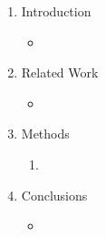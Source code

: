 \documentclass{article}
\begin{document}
\begin{enumerate}
	\item Introduction
	\begin{itemize}
		\item 
	\end{itemize}
	\item Related Work
	\begin{itemize}
		\item 
	\end{itemize}
	\item Methods
	\begin{enumerate}
		\item 
	\end{enumerate}
	\item Conclusions
	\begin{itemize}
		\item 
	\end{itemize}
\end{enumerate}

\pagebreak


\end{document}
